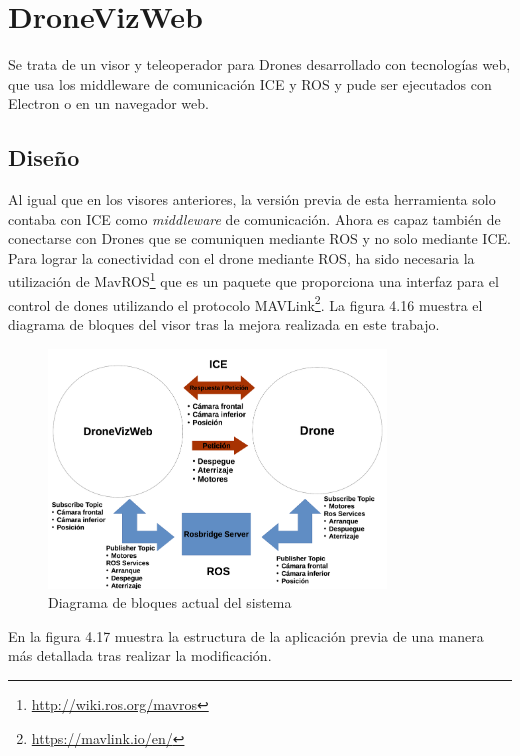 \section{DroneVizWeb}
Se trata de un visor y teleoperador para Drones desarrollado con tecnologías web, que usa los middleware de comunicación ICE y ROS y pude ser ejecutados con Electron o en un navegador web.

\subsection{Diseño}
Al igual que en los visores anteriores, la versión previa de esta herramienta solo contaba con ICE como \textit{middleware} de comunicación. Ahora es capaz también de conectarse con Drones que se comuniquen mediante ROS y no solo mediante ICE. Para lograr la conectividad con el drone mediante ROS, ha sido necesaria la utilización de MavROS\footnote{\url{http://wiki.ros.org/mavros}} que es un paquete que proporciona una interfaz para el control de dones utilizando el protocolo MAVLink\footnote{\url{https://mavlink.io/en/}}. La figura 4.16 muestra el diagrama de bloques del visor tras la mejora realizada en este trabajo.

\begin{figure}[H]
  \begin{center}
    \includegraphics[width=0.8\textwidth]{figures/DroneViz2.png}
		\caption{Diagrama de bloques actual del sistema}
		\label{fig.esquemaTurtleBot2}
		\end{center}
\end{figure}

En la figura 4.17 muestra la estructura de la aplicación previa de una manera más detallada tras realizar la modificación.

